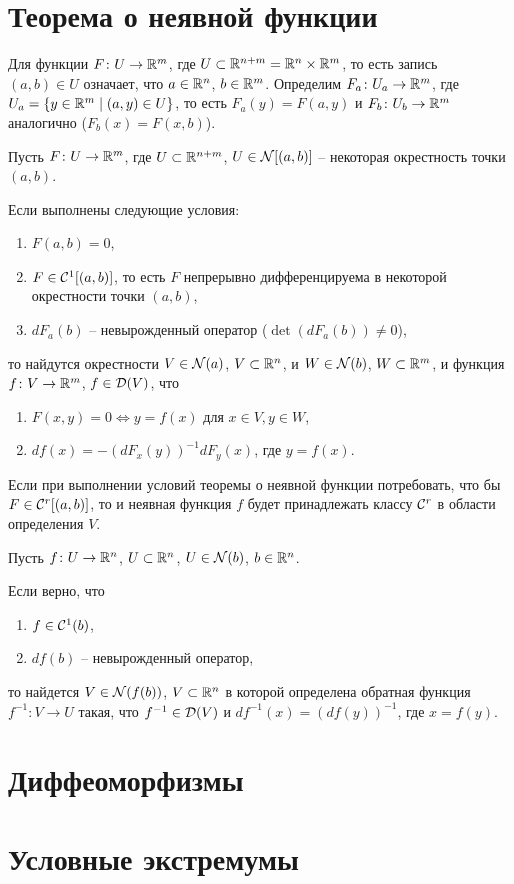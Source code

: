 	\section{Теорема о неявной функции}
	Для функции $F\colon U \to \mathbb{R}^m$, где $U\subset \mathbb{R}^{n+m} = \mathbb{R}^n \times \mathbb{R}^m$, то есть запись $(a, b) \in U$ означает, что $a\in \mathbb{R}^n$, $b \in \mathbb{R}^m$.
	Определим $F_a\colon U_a \to \mathbb{R}^m$, где $U_a = \{y\in\mathbb{R}^m\mid (a,y)\in U\}$, то есть $F_a(y) = F(a,y)$ и $F_b\colon U_b \to \mathbb{R}^m$ аналогично ($F_b(x) = F(x, b)$).
	
	\begin{theorem}
		Пусть $F\colon U \to \mathbb{R}^m$, где $U\subset \mathbb{R}^{n+m}$, $U\in \mathcal{N}[(a,b)]$ -- некоторая окрестность точки $(a,b)$. 
		
		Если выполнены следующие условия:
		\begin{enumerate}
			\item $F(a,b)=0$,
			\item \label{cond1} $F\in \mathcal{C}^1 [(a,b)]$, то есть $F$ непрерывно дифференцируема в некоторой окрестности точки $(a,b)$,
			\item $dF_a(b)$ -- невырожденный оператор ($\det(dF_a(b))\not= 0$),
		\end{enumerate}
		то найдутся окрестности $V \in \mathcal{N}(a)$, $V \subset \mathbb{R}^n$, и $W \in \mathcal{N}(b)$, $W \subset \mathbb{R}^m$, и функция $f\colon V \to\mathbb{R}^m$, $f\in\mathcal{D}(V)$, что
		\begin{enumerate}
			\item $F(x,y) = 0 \Longleftrightarrow y=f(x)$ для $x\in V, y \in W$,
			\item $df(x) = - (dF_x(y))^{-1}dF_y(x)$, где $y = f(x)$.
		\end{enumerate}
	\end{theorem}	

	\begin{corollary}
		Если при выполнении условий теоремы о неявной функции потребовать, что бы $F\in\mathcal{C}^r[(a,b)]$, то и неявная функция $f$ будет принадлежать классу $\mathcal{C}^r$ в области определения $V$.
	\end{corollary}

	\begin{corollary}
		Пусть $f\colon U \to \mathbb{R}^n$, $U\subset \mathbb{R}^n$, $U \in \mathcal{N} (b)$, $b\in \mathbb{R}^n$. 
		
		Если верно, что 
		\begin{enumerate}
			\item $f\in \mathcal{C}^1(b)$,
			\item $df(b)$ -- невырожденный оператор,
		\end{enumerate}
		то найдется $V\in \mathcal{N}(f(b))$, $V \subset \mathbb{R}^n$ в которой определена обратная функция $f^{-1}\colon V \to U$ такая, что $f^{-1}\in \mathcal{D}(V)$ и $df^{-1}(x) = (df(y))^{-1}$, где $x=f(y)$.
	\end{corollary}
	
	\section{Диффеоморфизмы}
	
	\section{Условные экстремумы} 